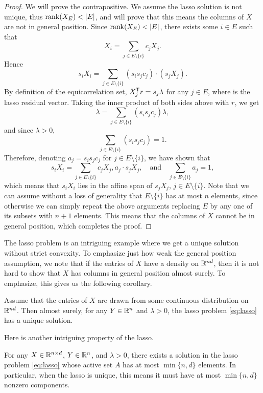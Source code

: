 \documentclass{article}
\begin{document}
\begin{proof}
We will prove the contrapositive. We assume the lasso solution is not unique,
thus $\operatorname{rank}(X_E) < |E|$, and will prove that this means the columns of $X$ are
not in general position. Since $\operatorname{rank}(X_E) < |E|$, there exists some $i \in E$
such that 
\[
X_i = \sum_{j \in E\setminus\{i\}} c_j X_j.
\]
Hence
\[
s_i X_i = \sum_{j \in E\setminus\{i\}} (s_i s_j c_j) \cdot (s_j X_j).
\]
By definition of the equicorrelation set, $X_j^{\mathsf{T}} r = s_j \lambda$ for any $j
\in E$, where  is the lasso residual vector. Taking the
inner  product of both sides above with $r$, we get 
\[
\lambda = \sum_{j \in E\setminus\{i\}} (s_i s_j c_j) \lambda,
\]
and since $\lambda>0$,
\[
\sum_{j \in E\setminus\{i\}} (s_i s_j c_j) = 1.
\]
Therefore, denoting $a_j = s_i s_j c_j$ for $j \in E\setminus\{i\}$, we have
shown that
\[
s_i X_i = \sum_{j \in E\setminus\{i\}} c_j X_j,
a_j \cdot s_j X_j, \quad \text{and} \quad 
\sum_{j \in E\setminus\{i\}} a_j = 1,
\]
which means that $s_iX_i$ lies in the affine span of $s_jX_j$, $j \in
E\setminus\{i\}$. Note that we can assume without a loss of generality that  
$E\setminus\{i\}$ has at most $n$ elements, since otherwise we can simply repeat
the above arguments replacing $E$ by any one of its subsets with $n+1$
elements. This means that the columns of $X$ cannot be in general position,
which completes the proof. 
\end{proof}

The lasso problem is an intriguing example where we get a unique solution
without strict convexity. To emphasize just how weak the general position
assumption, we note that if the entries of $X$ have a density on $\mathbb{R}^{nd}$, then
it is not hard to show that $X$ has columns in general position almost surely.
To emphasize, this gives us the following corollary.      

\begin{corollary}
Assume that the entries of $X$ are drawn from some continuous distribution on
$\mathbb{R}^{nd}$. Then almost surely, for any $Y \in \mathbb{R}^n$ and $\lambda>0$, the lasso
problem \eqref{eq:lasso} has a unique solution.  
\end{corollary} 

Here is another intriguing property of the lasso. 

\begin{proposition}
For any $X \in \mathbb{R}^{n \times d}$, $Y \in \mathbb{R}^n$, and $\lambda>0$, there exists a 
solution in the lasso problem \eqref{eq:lasso} whose active set $A$ has at most 
$\min\{n,d\}$ elements. In particular, when the lasso is unique, this means it
must have at most $\min\{n,d\}$ nonzero components.  
\end{proposition}
\end{document}

